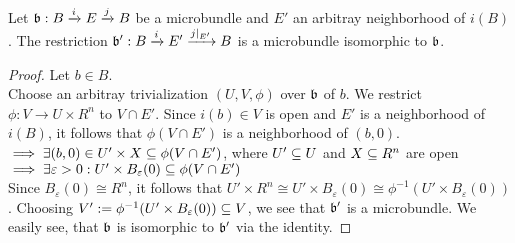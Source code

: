  \\
Let $\bb: \bundle{B}{E}{i}{j}$ be a microbundle and $E'$ an arbitray neighborhood of $i(B)$.
The restriction $\bundledef{\bb'}{B}{E'}{i}{j\restrict{E'}}$ is a microbundle isomorphic to $\bb$.
\begin{proof}
Let $b \in B$. \\
Choose an arbitray trivialization $(U, V, \phi)$ over $\bb$ of $b$.
We restrict $\phi: V \to U \times R^n$ to $V \cap E'$.
Since $i(b) \in V$ is open and $E'$ is a neighborhood of $i(B)$, it follows that $\phi(V \cap E')$ is a neighborhood of $(b, 0)$.
\\ $\implies \exists (b, 0) \in U' \times X \sub \phi(V \cap E')$, where $U' \sub U$ and $X \sub R^n$ are open
\\ $\implies \exists \varepsilon > 0: U' \times B_\varepsilon(0) \sub \phi(V \cap E')$ \\
Since $B_\varepsilon(0) \cong R^n$, it follows that $U' \times R^n \cong U' \times B_\varepsilon(0) \cong \phi^{-1}(U' \times B_\varepsilon(0))$.
Choosing $V' := \phi^{-1}(U' \times B_\varepsilon(0)) \sub V$, we see that $\bb'$ is a microbundle.
We easily see, that $\bb$ is isomorphic to $\bb'$ via the identity.
\end{proof}